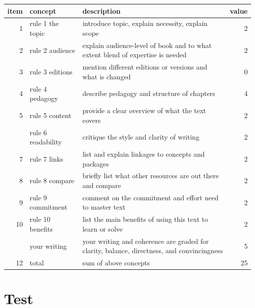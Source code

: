 \documentclass[
]{book}
\begin{document}
\begin{tabular}{rllr}
\toprule
item & concept & description & value\\
\midrule
1 & rule 1 the topic & introduce topic, explain necessity, explain scope & 2\\
2 & rule 2 audience & explain audience-level of book and to what extent blend of expertise is needed & 2\\
3 & rule 3 editions & mention different editions or versions and what is changed & 0\\
4 & rule 4 pedagogy & describe pedagogy and structure of chapters & 4\\
5 & rule 5 content & provide a clear overview of what the text covers & 2\\
\addlinespace
6 & rule 6 readability & critique the style and clarity of writing & 2\\
7 & rule 7 links & list and explain linkages to concepts and packages & 2\\
8 & rule 8 compare & briefly list what other resources are out there and compare & 2\\
9 & rule 9 commitment & comment on the commitment and effort need to master text & 2\\
10 & rule 10 benefits & list the main benefits of using this text to learn or solve & 2\\
\addlinespace
11 & your writing & your writing and coherence are graded for clarity, balance, directness, and convincingness & 5\\
12 & total & sum of above concepts & 25\\
\bottomrule
\end{tabular}

\hypertarget{test}{%
\chapter{Test}\label{test}}

  
\end{document}
